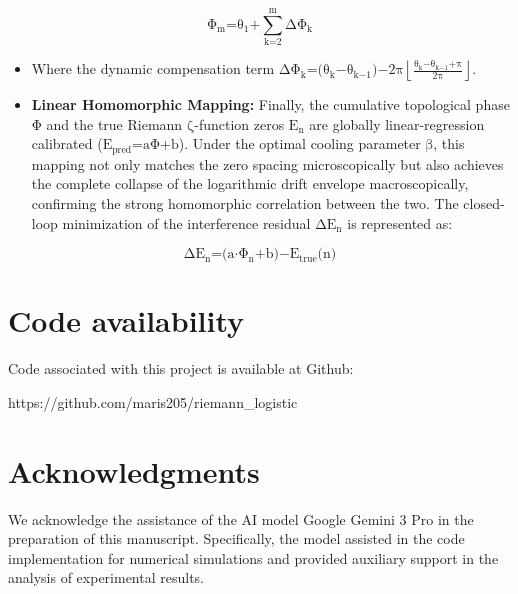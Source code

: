 \[\text{Φ}_{\text{m}}\text{=}\text{θ}_{\text{1}}\text{+}\sum_{\text{k}\text{=2}}^{\text{m}}\text{Δ}\text{Φ}_{\text{k}}\]

\begin{itemize}
\item
  Where the dynamic compensation term
  \(\text{Δ}\text{Φ}_{\text{k}}\text{=(}\text{θ}_{\text{k}}\text{−}\text{θ}_{\text{k}\text{−1}}\text{)−2}\text{π}\left\lfloor \frac{\text{θ}_{\text{k}}\text{−}\text{θ}_{\text{k}\text{−1}}\text{+}\text{π}}{\text{2}\text{π}} \right\rfloor\).
\end{itemize}

\begin{itemize}
\item
  \textbf{Linear Homomorphic Mapping:} Finally, the cumulative
  topological phase \(\text{Φ}\) and the true Riemann
  \(\text{ζ}\)-function zeros \(\text{E}_{\text{n}}\) are globally
  linear-regression calibrated
  (\(\text{E}_{\text{pred}}\text{=}\text{a}\text{Φ+}\text{b}\)). Under
  the optimal cooling parameter \(\text{β}\), this mapping not only
  matches the zero spacing microscopically but also achieves the
  complete collapse of the logarithmic drift envelope macroscopically,
  confirming the strong homomorphic correlation between the two. The
  closed-loop minimization of the interference residual
  \(\text{Δ}\text{E}_{\text{n}}\) is represented as:
\end{itemize}

\[\text{Δ}\text{E}_{\text{n}}\text{=(}\text{a}\text{⋅}\text{Φ}_{\text{n}}\text{+}\text{b}\text{)−}\text{E}_{\text{true}}\text{(}\text{n}\text{)}\]

\section*{Code availability}

Code associated with this project is available at Github:

{https://github.com/maris205/riemann\_logistic}


\section*{Acknowledgments}

We acknowledge the assistance of the AI model Google Gemini 3 Pro in the
preparation of this manuscript. Specifically, the model assisted in the
code implementation for numerical simulations and provided auxiliary
support in the analysis of experimental results.

